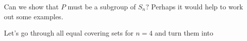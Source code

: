 \documentclass[a4paper, 12pt]{article}
\begin{document}
\begin{idea}
    Can we show that \( P \) must be a subgroup of \( S_{n} \)? Perhaps it would help to work out some examples.
\end{idea}

\begin{example}
    Let's go through all equal covering sets for \( n = 4 \) and turn them into 
\end{example}
\end{document}
